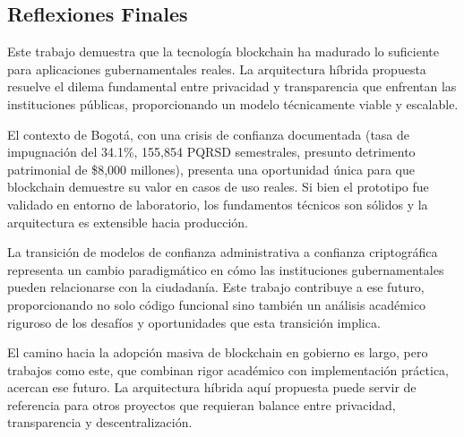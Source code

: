 \subsection{Reflexiones Finales}

Este trabajo demuestra que la tecnología blockchain ha madurado lo suficiente para aplicaciones gubernamentales reales. La arquitectura híbrida propuesta resuelve el dilema fundamental entre privacidad y transparencia que enfrentan las instituciones públicas, proporcionando un modelo técnicamente viable y escalable.

El contexto de Bogotá, con una crisis de confianza documentada (tasa de impugnación del 34.1\%, 155,854 PQRSD semestrales, presunto detrimento patrimonial de \$8,000 millones), presenta una oportunidad única para que blockchain demuestre su valor en casos de uso reales. Si bien el prototipo fue validado en entorno de laboratorio, los fundamentos técnicos son sólidos y la arquitectura es extensible hacia producción.

La transición de modelos de confianza administrativa a confianza criptográfica representa un cambio paradigmático en cómo las instituciones gubernamentales pueden relacionarse con la ciudadanía. Este trabajo contribuye a ese futuro, proporcionando no solo código funcional sino también un análisis académico riguroso de los desafíos y oportunidades que esta transición implica.

El camino hacia la adopción masiva de blockchain en gobierno es largo, pero trabajos como este, que combinan rigor académico con implementación práctica, acercan ese futuro. La arquitectura híbrida aquí propuesta puede servir de referencia para otros proyectos que requieran balance entre privacidad, transparencia y descentralización.